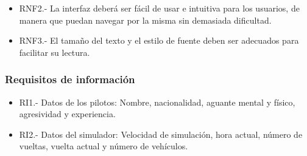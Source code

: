 \begin{itemize}
    \item RNF2.- La interfaz deberá ser fácil de usar e intuitiva para los usuarios, de manera que puedan navegar por la misma sin demasiada dificultad.
    \item RNF3.- El tamaño del texto y el estilo de fuente deben ser adecuados para facilitar su lectura.
\end{itemize}

\subsubsection{Requisitos de información}

\begin{itemize}
    \item RI1.- Datos de los pilotos: Nombre, nacionalidad, aguante mental y físico, agresividad y experiencia.
    \item RI2.- Datos del simulador: Velocidad de simulación, hora actual, número de vueltas, vuelta actual y número de vehículos.
\end{itemize}